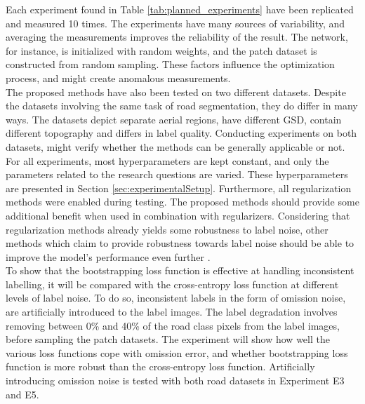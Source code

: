 Each experiment found in Table \ref{tab:planned_experiments} have been replicated and measured 10 times. The experiments have many sources of variability, and averaging the measurements improves the reliability of the result. The network, for instance, is initialized with random weights, and the patch dataset is constructed from random sampling. These factors influence the optimization process, and might create anomalous measurements.\\

The proposed methods have also been tested on two different datasets. Despite the datasets involving the same task of road segmentation, they do differ in many ways. The datasets depict separate aerial regions, have different \ac{GSD}, contain different topography and differs in label quality. Conducting experiments on both datasets, might verify whether the methods can be generally applicable or not.\\

For all experiments, most hyperparameters are kept constant, and only the parameters related to the research questions are varied. These hyperparameters are presented in Section \ref{sec:experimentalSetup}. Furthermore, all regularization methods were enabled during testing. The proposed methods should provide some additional benefit when used in combination with regularizers. Considering that regularization methods already yields some robustness to label noise, other methods which claim to provide robustness towards label noise should be able to improve the model's performance even further .  \\

To show that the bootstrapping loss function is effective at handling inconsistent labelling, it will be compared with the cross-entropy loss function at different levels of label noise. To do so, inconsistent labels in the form of omission noise, are artificially introduced to the label images. The label degradation involves removing between 0\% and 40\% of the road class pixels from the label images, before sampling the patch datasets. The experiment will show how well the various loss functions cope with omission error, and whether bootstrapping loss function is more robust than the cross-entropy loss function. Artificially introducing omission noise is tested with both road datasets in Experiment E3 and E5.\\

